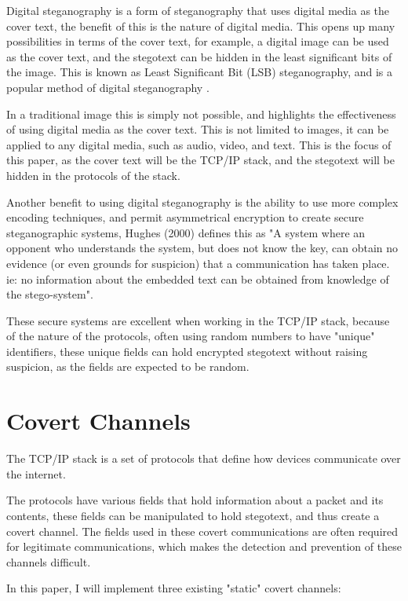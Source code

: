 Digital steganography is a form of steganography that uses digital media as the cover text, the benefit of this is the nature of digital media. This opens up many possibilities in terms of the cover text, for example, a digital image can be used as the cover text, and the stegotext can be hidden in the least significant bits of the image. This is known as Least Significant Bit (LSB) steganography, and is a popular method of digital steganography \cite{AESTfHD}.

In a traditional image this is simply not possible, and highlights the effectiveness of using digital media as the cover text. This is not limited to images, it can be applied to any digital media, such as audio, video, and text. This is the focus of this paper, as the cover text will be the TCP/IP stack, and the stegotext will be hidden in the protocols of the stack.

Another benefit to using digital steganography is the ability to use more complex encoding techniques, and permit asymmetrical encryption to create secure steganographic systems, Hughes (2000) \cite{SaW} defines this as "A system where an opponent who understands the system, but does not know the key, can obtain no evidence (or even grounds for suspicion) that a communication has taken place. ie: no information about the embedded text can be obtained from knowledge of the stego-system".

These secure systems are excellent when working in the TCP/IP stack, because of the nature of the protocols, often using random numbers to have "unique" identifiers, these unique fields can hold encrypted stegotext without raising suspicion, as the fields are expected to be random.

\section{Covert Channels}

The TCP/IP stack is a set of protocols that define how devices communicate over the internet.

The protocols have various fields that hold information about a packet and its contents, these fields can be manipulated to hold stegotext, and thus create a covert channel. The fields used in these covert communications are often required for legitimate communications, which makes the detection and prevention of these channels difficult.

In this paper, I will implement three existing "static" covert channels:

